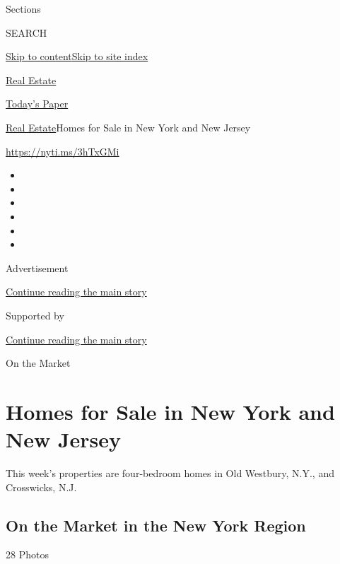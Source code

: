Sections

SEARCH

\protect\hyperlink{site-content}{Skip to
content}\protect\hyperlink{site-index}{Skip to site index}

\href{https://www.nytimes.com/section/realestate}{Real Estate}

\href{https://myaccount.nytimes.com/auth/login?response_type=cookie\&client_id=vi}{}

\href{https://www.nytimes.com/section/todayspaper}{Today's Paper}

\href{/section/realestate}{Real Estate}\textbar{}Homes for Sale in New
York and New Jersey

\url{https://nyti.ms/3hTxGMi}

\begin{itemize}
\item
\item
\item
\item
\item
\item
\end{itemize}

Advertisement

\protect\hyperlink{after-top}{Continue reading the main story}

Supported by

\protect\hyperlink{after-sponsor}{Continue reading the main story}

On the Market

\hypertarget{homes-for-sale-in-new-york-and-new-jersey}{%
\section{Homes for Sale in New York and New
Jersey}\label{homes-for-sale-in-new-york-and-new-jersey}}

This week's properties are four-bedroom homes in Old Westbury, N.Y., and
Crosswicks, N.J.

\href{https://www.nytimes.com/slideshow/2020/07/30/realestate/on-the-market-in-the-new-york-region.html}{}

\hypertarget{on-the-market-in-the-new-york-region}{%
\subsection{On the Market in the New York
Region}\label{on-the-market-in-the-new-york-region}}

28 Photos

